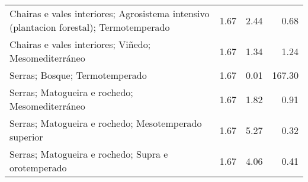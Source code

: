 \begin{table}[p]
\begin{tabular}{lrrr}
  Chairas e vales interiores; Agrosistema intensivo (plantacion forestal); Termotemperado & 1.67 & 2.44 & 0.68 \\ 
  Chairas e vales interiores; Viñedo; Mesomediterráneo & 1.67 & 1.34 & 1.24 \\ 
  Serras; Bosque; Termotemperado & 1.67 & 0.01 & 167.30 \\ 
  Serras; Matogueira e rochedo; Mesomediterráneo & 1.67 & 1.82 & 0.91 \\ 
  Serras; Matogueira e rochedo; Mesotemperado superior & 1.67 & 5.27 & 0.32 \\ 
  Serras; Matogueira e rochedo; Supra e orotemperado & 1.67 & 4.06 & 0.41 \\ 
   \hline
\end{tabular}
\end{table}
